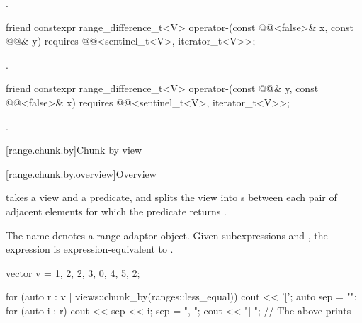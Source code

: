 \begin{itemdescr}
\pnum
\returns
{}.
\end{itemdescr}

%
\begin{itemdecl}
friend constexpr range_difference_t<V>
  operator-(const @@<false>& x, const @@& y)
    requires @@<sentinel_t<V>, iterator_t<V>>;
\end{itemdecl}

\begin{itemdescr}
\pnum
\returns
{}.
\end{itemdescr}

%
\begin{itemdecl}
friend constexpr range_difference_t<V>
  operator-(const @@& y, const @@<false>& x)
    requires @@<sentinel_t<V>, iterator_t<V>>;
\end{itemdecl}

\begin{itemdescr}
\pnum
\returns
{}.
\end{itemdescr}

[range.chunk.by]{Chunk by view}

[range.chunk.by.overview]{Overview}

\pnum
{} takes a view and a predicate, and
splits the view into s
between each pair of adjacent elements
for which the predicate returns .

\pnum
{}%
The name  denotes
a range adaptor object.
Given subexpressions  and ,
the expression  is expression-equivalent to
.
\begin{example}
\begin{codeblock}
vector v = {1, 2, 2, 3, 0, 4, 5, 2};

for (auto r : v | views::chunk_by(ranges::less_equal{})) {
  cout << '[';
  auto sep = "";
  for (auto i : r) {
    cout << sep << i;
    sep = ", ";
  }
  cout << "] ";
}
// The above prints \tcode{[1, 2, 2, 3] [0, 4, 5] [2]}
\end{codeblock}
\end{example}

